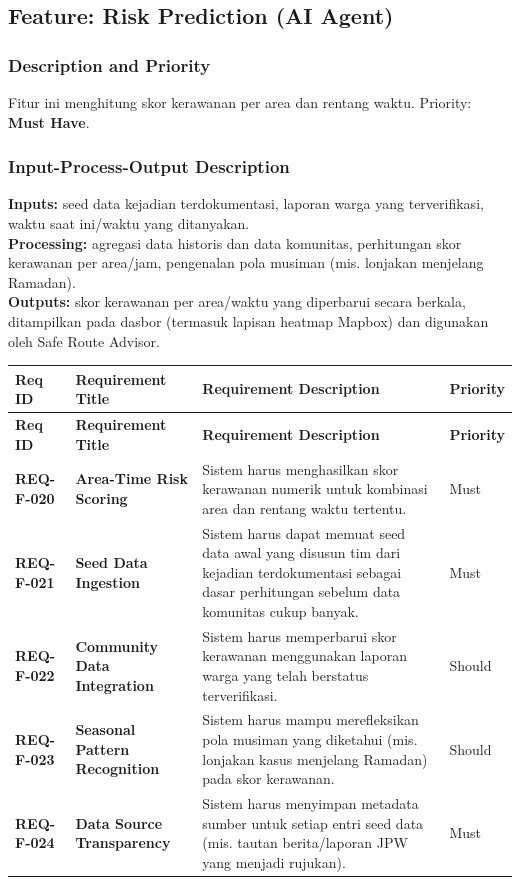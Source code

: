 \documentclass[11pt,a4paper]{article}
\newcommand{\req}[4]{\textbf{#1} & \textbf{#2} & #3 & #4 \\ \hline}
\begin{document}
\subsection{Feature: Risk Prediction (AI Agent)}
\subsubsection{Description and Priority}
Fitur ini menghitung skor kerawanan per area dan rentang waktu. Priority: \textbf{Must Have}.

\subsubsection{Input-Process-Output Description}
\textbf{Inputs:} seed data kejadian terdokumentasi, laporan warga yang terverifikasi, waktu saat ini/waktu yang ditanyakan.\\
\textbf{Processing:} agregasi data historis dan data komunitas, perhitungan skor kerawanan per area/jam, pengenalan pola musiman (mis. lonjakan menjelang Ramadan).\\
\textbf{Outputs:} skor kerawanan per area/waktu yang diperbarui secara berkala, ditampilkan pada dasbor (termasuk lapisan heatmap Mapbox) dan digunakan oleh Safe Route Advisor.

\begin{longtable}{|L{2.3cm}|L{4.0cm}|L{6.9cm}|L{1.6cm}|}
\hline
{}\textbf{Req ID} & \textbf{Requirement Title} & \textbf{Requirement Description} & \textbf{Priority} \\ \hline
\endfirsthead
\hline
{}\textbf{Req ID} & \textbf{Requirement Title} & \textbf{Requirement Description} & \textbf{Priority} \\ \hline
\endhead
\req{REQ-F-020}{Area-Time Risk Scoring}{Sistem harus menghasilkan skor kerawanan numerik untuk kombinasi area dan rentang waktu tertentu.}{Must}
\req{REQ-F-021}{Seed Data Ingestion}{Sistem harus dapat memuat seed data awal yang disusun tim dari kejadian terdokumentasi sebagai dasar perhitungan sebelum data komunitas cukup banyak.}{Must}
\req{REQ-F-022}{Community Data Integration}{Sistem harus memperbarui skor kerawanan menggunakan laporan warga yang telah berstatus terverifikasi.}{Should}
\req{REQ-F-023}{Seasonal Pattern Recognition}{Sistem harus mampu merefleksikan pola musiman yang diketahui (mis. lonjakan kasus menjelang Ramadan) pada skor kerawanan.}{Should}
\req{REQ-F-024}{Data Source Transparency}{Sistem harus menyimpan metadata sumber untuk setiap entri seed data (mis. tautan berita/laporan JPW yang menjadi rujukan).}{Must}
\end{longtable}
\end{document}
